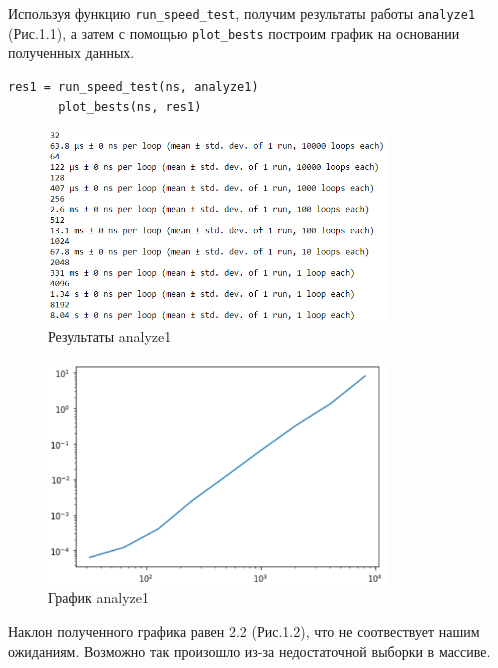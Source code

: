 \documentclass[a4paper,12pt]{report}
\begin{document}
    Используя функцию \texttt{run\_speed\_test}, получим результаты работы \texttt{analyze1} (Рис.1.1), а затем с помощью \texttt{plot\_bests} построим график на основании полученных данных.
\begin{lstlisting}[caption=Получение результатов для analyze1]
       res1 = run_speed_test(ns, analyze1)
       plot_bests(ns, res1)
\end{lstlisting}
\begin{figure}[H]
        \centering
        \includegraphics[width=0.8\textwidth]{fig1-1.PNG}
        \caption{Результаты analyze1}
        \label{fig:fig1-1}
\end{figure}  
\begin{figure}[H]
        \centering
        \includegraphics[width=0.8\textwidth]{fig1-2.PNG}
        \caption{График analyze1}
        \label{fig:fig1-2}
\end{figure}    

    Наклон полученного графика равен 2.2 (Рис.1.2), что не соотвествует нашим ожиданиям. Возможно так произошло из-за недостаточной выборки в массиве.
    
\end{document}
